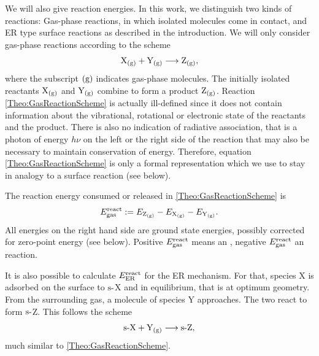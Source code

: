 We will also give reaction energies. In this work, we distinguish two kinds of reactions:
Gas-phase reactions, in which isolated molecules come in contact, and
ER type %
surface reactions as described in the introduction. We will only consider
gas-phase reactions according to the scheme
\begin{equation}
 \text X_\text{(g)}+\text Y_\text{(g)} \longrightarrow  \text Z_\text{(g)},
 \label{Theo:GasReactionScheme}
\end{equation} 
where the subscript $(\text g)$ indicates gas-phase molecules. The initially
isolated reactants $\text X_\text{(g)}$ and $\text Y_\text{(g)}$ combine to form a product $\text Z_\text{(g)}$. 
Reaction \eqref{Theo:GasReactionScheme} is actually ill-defined since it does
not contain information about the vibrational, rotational or electronic state
of the reactants and the product. There is also no indication of
radiative association, that is a photon of energy $h\nu$ on the left or the
right side of the reaction that may also be necessary to maintain conservation
of energy. Therefore, equation \eqref{Theo:GasReactionScheme} is only a formal representation which we
use to stay in analogy to a surface reaction (see below).

The reaction energy consumed or released in \eqref{Theo:GasReactionScheme} is
\begin{equation}
 E^{\text{react}}_{\text{gas}}:= E_{\text Z_\text{(g)}} - E_{\text X_\text{(g)}} - E_{\text Y_\text{(g)}}.
 \label{Theo:ReactionEnergyGas}
\end{equation}
All energies on the right hand side are ground state energies, possibly
corrected for zero-point energy (see below). Positive
$E^{\text{react}}_{\text{gas}}$ means an , negative $E^{\text{react}}_{\text{gas}}$ an
 reaction. 

It is also possible to calculate  $E^{\text{react}}_{\text{ER}}$ for the ER mechanism. For that,
species X is adsorbed on the surface to $\text{s-}$X and in equilibrium, that is at optimum
geometry. From the surrounding gas, a molecule of species Y approaches. The two react
to form $\text{s-}$Z. This follows the scheme
\begin{equation}
 \text{s-}\text X+\text Y_\text{(g)} \longrightarrow  \text{s-}\text Z,
 \label{Theo:SurfaceReactionScheme}
\end{equation} 
much similar to \eqref{Theo:GasReactionScheme}. 

